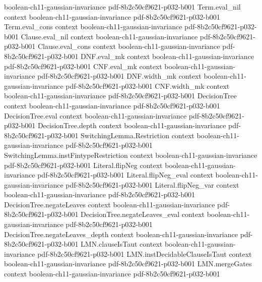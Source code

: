 \begin{theorem}
  {boolean-ch11-gaussian-invariance}
  {pdf-8b2c50cf9621-p032-b001}
\proofstep
  {Term.eval_nil}
  {context}
  {boolean-ch11-gaussian-invariance}
  {pdf-8b2c50cf9621-p032-b001}
\proofstep
  {Term.eval_cons}
  {context}
  {boolean-ch11-gaussian-invariance}
  {pdf-8b2c50cf9621-p032-b001}
\proofstep
  {Clause.eval_nil}
  {context}
  {boolean-ch11-gaussian-invariance}
  {pdf-8b2c50cf9621-p032-b001}
\proofstep
  {Clause.eval_cons}
  {context}
  {boolean-ch11-gaussian-invariance}
  {pdf-8b2c50cf9621-p032-b001}
\proofstep
  {DNF.eval_mk}
  {context}
  {boolean-ch11-gaussian-invariance}
  {pdf-8b2c50cf9621-p032-b001}
\proofstep
  {CNF.eval_mk}
  {context}
  {boolean-ch11-gaussian-invariance}
  {pdf-8b2c50cf9621-p032-b001}
\proofstep
  {DNF.width_mk}
  {context}
  {boolean-ch11-gaussian-invariance}
  {pdf-8b2c50cf9621-p032-b001}
\proofstep
  {CNF.width_mk}
  {context}
  {boolean-ch11-gaussian-invariance}
  {pdf-8b2c50cf9621-p032-b001}
\proofstep
  {DecisionTree}
  {context}
  {boolean-ch11-gaussian-invariance}
  {pdf-8b2c50cf9621-p032-b001}
\proofstep
  {DecisionTree.eval}
  {context}
  {boolean-ch11-gaussian-invariance}
  {pdf-8b2c50cf9621-p032-b001}
\proofstep
  {DecisionTree.depth}
  {context}
  {boolean-ch11-gaussian-invariance}
  {pdf-8b2c50cf9621-p032-b001}
\proofstep
  {SwitchingLemma.Restriction}
  {context}
  {boolean-ch11-gaussian-invariance}
  {pdf-8b2c50cf9621-p032-b001}
\proofstep
  {SwitchingLemma.instFintypeRestriction}
  {context}
  {boolean-ch11-gaussian-invariance}
  {pdf-8b2c50cf9621-p032-b001}
\proofstep
  {Literal.flipNeg}
  {context}
  {boolean-ch11-gaussian-invariance}
  {pdf-8b2c50cf9621-p032-b001}
\proofstep
  {Literal.flipNeg_eval}
  {context}
  {boolean-ch11-gaussian-invariance}
  {pdf-8b2c50cf9621-p032-b001}
\proofstep
  {Literal.flipNeg_var}
  {context}
  {boolean-ch11-gaussian-invariance}
  {pdf-8b2c50cf9621-p032-b001}
\proofstep
  {DecisionTree.negateLeaves}
  {context}
  {boolean-ch11-gaussian-invariance}
  {pdf-8b2c50cf9621-p032-b001}
\proofstep
  {DecisionTree.negateLeaves_eval}
  {context}
  {boolean-ch11-gaussian-invariance}
  {pdf-8b2c50cf9621-p032-b001}
\proofstep
  {DecisionTree.negateLeaves_depth}
  {context}
  {boolean-ch11-gaussian-invariance}
  {pdf-8b2c50cf9621-p032-b001}
\proofstep
  {LMN.clauseIsTaut}
  {context}
  {boolean-ch11-gaussian-invariance}
  {pdf-8b2c50cf9621-p032-b001}
\proofstep
  {LMN.instDecidableClauseIsTaut}
  {context}
  {boolean-ch11-gaussian-invariance}
  {pdf-8b2c50cf9621-p032-b001}
\proofstep
  {LMN.mergeGates}
  {context}
  {boolean-ch11-gaussian-invariance}
  {pdf-8b2c50cf9621-p032-b001}
\proofstep

\end{theorem}
